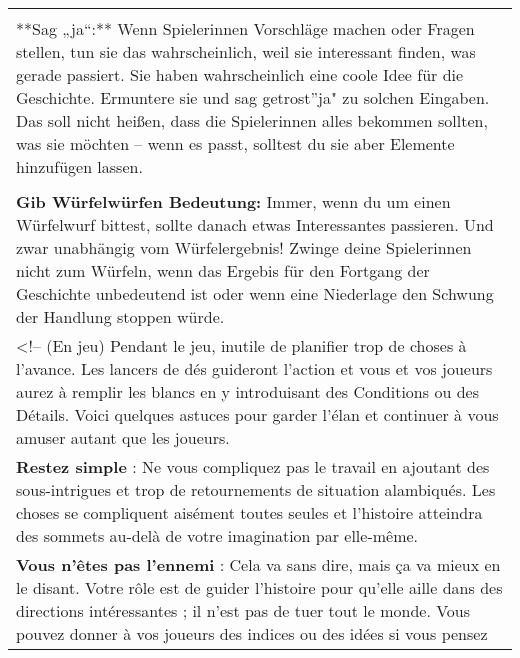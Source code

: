 \documentclass[]{article}
\begin{document}
\begin{longtable}[]{@{}l@{}}
\begin{minipage}[t]{0.05\columnwidth}
\strut\end{minipage}\tabularnewline
\begin{minipage}[t]{0.05\columnwidth}\raggedright\strut
**Sag „ja``:** Wenn Spielerinnen Vorschläge machen oder Fragen stellen,
tun sie das wahrscheinlich, weil sie interessant finden, was gerade
passiert. Sie haben wahrscheinlich eine coole Idee für die Geschichte.
Ermuntere sie und sag getrost''ja" zu solchen Eingaben. Das soll nicht
heißen, dass die Spielerinnen alles bekommen sollten, was sie möchten --
wenn es passt, solltest du sie aber Elemente hinzufügen lassen.
\strut\end{minipage}\tabularnewline
\begin{minipage}[t]{0.05\columnwidth}\raggedright\strut
\strut\end{minipage}\tabularnewline
\begin{minipage}[t]{0.05\columnwidth}\raggedright\strut
\textbf{Gib Würfelwürfen Bedeutung:} Immer, wenn du um einen Würfelwurf
bittest, sollte danach etwas Interessantes passieren. Und zwar
unabhängig vom Würfelergebnis! Zwinge deine Spielerinnen nicht zum
Würfeln, wenn das Ergebis für den Fortgang der Geschichte unbedeutend
ist oder wenn eine Niederlage den Schwung der Handlung stoppen würde.
\strut\end{minipage}\tabularnewline
\begin{minipage}[t]{0.05\columnwidth}\raggedright\strut
\textless{}!-- (En jeu) Pendant le jeu, inutile de planifier trop de
choses à l'avance. Les lancers de dés guideront l'action et vous et vos
joueurs aurez à remplir les blancs en y introduisant des Conditions ou
des Détails. Voici quelques astuces pour garder l'élan et continuer à
vous amuser autant que les joueurs.
\strut\end{minipage}\tabularnewline
\begin{minipage}[t]{0.05\columnwidth}\raggedright\strut
\textbf{Restez simple} : Ne vous compliquez pas le travail en ajoutant
des sous-intrigues et trop de retournements de situation alambiqués. Les
choses se compliquent aisément toutes seules et l'histoire atteindra des
sommets au-delà de votre imagination par elle-même.
\strut\end{minipage}\tabularnewline
\begin{minipage}[t]{0.05\columnwidth}\raggedright\strut
\textbf{Vous n'êtes pas l'ennemi} : Cela va sans dire, mais ça va mieux
en le disant. Votre rôle est de guider l'histoire pour qu'elle aille
dans des directions intéressantes ; il n'est pas de tuer tout le monde.
Vous pouvez donner à vos joueurs des indices ou des idées si vous pensez

\end{minipage}
\end{longtable}
\end{document}

